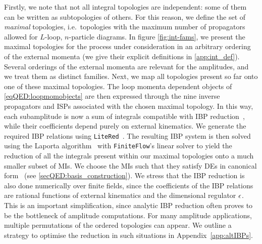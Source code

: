 \documentclass[main.tex]{subfiles}
\begin{document}
Firstly, we note that not all integral topologies are independent: some of them
can be written as subtopologies of others. For this reason, we define the set
of \textit{maximal} topologies, i.e.~topologies with the maximum number of
propagators allowed for $L$-loop, $n$-particle diagrams.  In figure
\ref{fig:int-fams}, we present the maximal topologies for the process under
consideration in an arbitrary ordering of the external momenta (we give their
explicit definitions in \cref{app:int_def}). Several orderings of the external
momenta are relevant for the amplitudes, and we treat them as distinct
families. Next, we map all topologies present so far onto one of these maximal
topologies. The loop momenta dependent objects of \cref{eqQED:loopmomobjects} are
then expressed through the nine inverse propagators and \acp{ISP} associated
with the chosen maximal topology. In this way, each subamplitude is now a sum
of integrals compatible with \ac{IBP}
reduction~\cite{Tkachov:1981wb,Chetyrkin:1981qh}, while their coefficients
depend purely on external kinematics. We generate the required \ac{IBP}
relations using \texttt{LiteRed}~\cite{Lee:2012cn}. The resulting \ac{IBP}
system is then solved using the Laporta algorithm~\cite{Laporta:2001dd} with
\texttt{FiniteFlow}'s linear solver to yield the reduction of all the integrals
present within our maximal topologies onto a much smaller subset of \acp{MI}.
We choose the \acp{MI} such that they satisfy \acp{DE} in canonical
form~\cite{Henn:2013pwa} (see \cref{secQED:basis_construction}). We stress that
the \ac{IBP} reduction is also done numerically over finite fields, since the
coefficients of the \ac{IBP} relations are rational functions of external
kinematics and the dimensional regulator $\epsilon$. This is an important
simplification, since analytic \ac{IBP} reduction often proves to be the
bottleneck of amplitude computations. For many amplitude applications, multiple permutations of the ordered topologies can appear. We outline a strategy to optimise the reduction in such situations in Appendix~\ref{app:altIBPs}.
\end{document}
